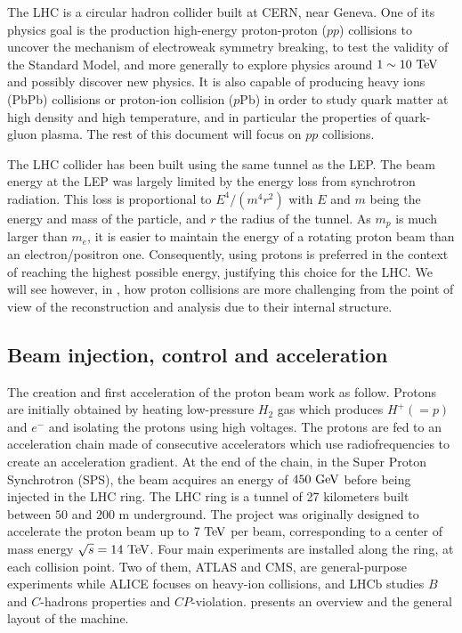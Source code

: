     The LHC \cite{LHC} is a circular hadron collider built at CERN, near Geneva. One of its physics
    goal is the production high-energy proton-proton ($pp$) collisions to uncover the mechanism
    of electroweak symmetry breaking, to test the validity of the Standard Model, and more
    generally to explore physics around $1\sim10 ~\text{TeV}$ and possibly discover new
    physics. It is also capable of producing heavy ions (PbPb) collisions or proton-ion
    collision ($p$Pb) in order to study quark matter at high density and high temperature,
    and in particular the properties of quark-gluon plasma. The rest of this document will
    focus on $pp$ collisions.

    The LHC collider has been built using the same tunnel as the LEP. The beam energy at
    the LEP was largely limited by the energy loss from synchrotron radiation. This loss
    is proportional to $E^4 / (m^{4} r^{2})$ with $E$ and $m$ being the energy and mass of the
    particle, and $r$ the radius of the tunnel. As $m_p$ is much larger than $m_e$, it is
    easier to maintain the energy of a rotating proton beam than an electron/positron one.
    Consequently, using protons is preferred in the context of reaching the highest possible
    energy, justifying this choice for the LHC. We will see however, in
    , how proton collisions are more challenging
    from the point of view of the reconstruction and analysis due to their internal structure.

    \subsection{Beam injection, control and acceleration}

    The creation and first acceleration of the proton beam work as follow. Protons are initially
    obtained by heating low-pressure $H_2$ gas which produces $H^+ (= p)$ and $e^-$ and
    isolating the protons using high voltages. The protons are fed to an acceleration
    chain made of consecutive accelerators which use radiofrequencies to create an acceleration
    gradient. At the end of the chain, in the Super Proton Synchrotron (SPS), the
    beam acquires an energy of $450~\text{GeV}$ before being injected in the LHC ring. The LHC
    ring is a tunnel of 27 kilometers built between $50$ and $200$ m underground. The
    project was originally designed to accelerate the proton beam up to $7~\text{TeV}$ per beam,
    corresponding to a center of mass energy $\sqrt{s} = 14~\text{TeV}$. Four main experiments are
    installed along the ring, at each collision point. Two of them, ATLAS and CMS, are
    general-purpose experiments while ALICE focuses on heavy-ion collisions, and LHCb studies
    $B$ and $C$-hadrons properties and $CP$-violation.  presents an
    overview and the general layout of the machine.


